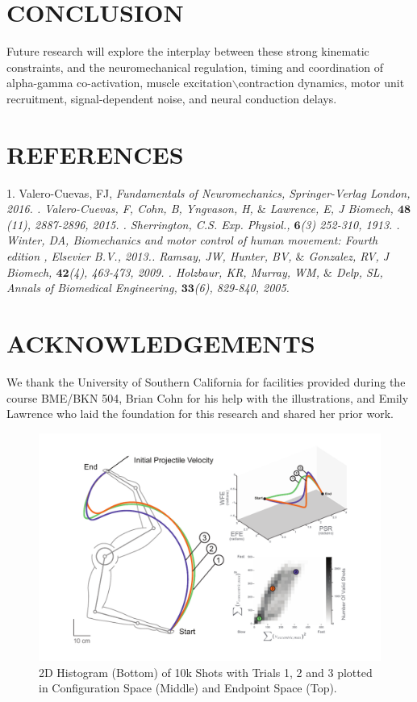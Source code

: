 \documentclass[12pt]{article}
\begin{document}
\begin{multicols}{2}
\section*{\normalsize CONCLUSION}
Future research will explore the interplay between these strong kinematic constraints, and the neuromechanical regulation, timing and coordination of alpha-gamma co-activation, muscle excitation$\backslash$contraction dynamics, motor unit recruitment, signal-dependent noise, and neural conduction delays.
\section*{\normalsize REFERENCES}
\begin{flushleft}
1. Valero-Cuevas, FJ, \it Fundamentals of Neuromechanics\rm, Springer-Verlag London, 2016. . Valero-Cuevas, F, Cohn, B, Yngvason, H, $\&$ Lawrence, E, \it J Biomech\rm,  $\textbf{48}$(11), 2887-2896, 2015. . Sherrington, C.S. \it Exp. Physiol.\rm, $\textbf{6}$(3) 252-310, 1913. . Winter, DA, \it Biomechanics and motor control of human movement: Fourth edition \rm, Elsevier B.V., 2013.. Ramsay, JW, Hunter, BV, $\&$ Gonzalez, RV, \it J Biomech\rm, $\textbf{42}$(4), 463-473, 2009. . Holzbaur, KR, Murray, WM, $\&$ Delp, SL, \it Annals of Biomedical Engineering\rm, $\textbf{33}$(6), 829-840, 2005.
\end{flushleft}
\section*{\normalsize ACKNOWLEDGEMENTS}
We thank the University of Southern California for facilities provided during the course BME/BKN 504, Brian Cohn for his help with the illustrations, and Emily Lawrence who laid the foundation for this research and shared her prior work.
\end{multicols}
\begin{figure}[H]
\centering
\includegraphics{images/Figure3}
\caption{2D Histogram (Bottom) of 10k Shots with Trials 1, 2 and 3 plotted in Configuration Space (Middle) and Endpoint Space (Top).}\label{Figure4}
\end{figure}
\end{document}
